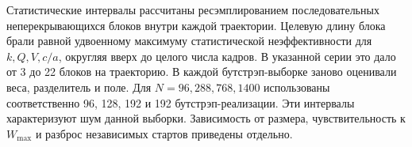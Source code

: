 Статистические интервалы рассчитаны ресэмплированием последовательных
неперекрывающихся блоков внутри каждой траектории. Целевую длину блока
брали равной удвоенному максимуму статистической неэффективности
для \(k,Q,V,c/a\), округляя вверх до целого числа кадров.
В указанной серии это дало от 3 до 22 блоков на траекторию. В каждой бутстрэп-выборке
заново оценивали веса, разделитель и поле. Для \(N=96,288,768,1400\)
использованы соответственно 96, 128, 192 и 192 бутстрэп-реализации.
Эти интервалы характеризуют шум данной выборки. Зависимость от размера,
чувствительность к \(W_{\max}\) и разброс независимых стартов
приведены отдельно.
